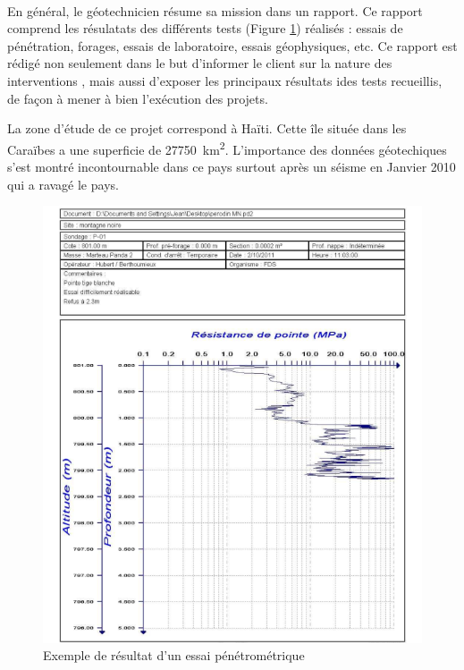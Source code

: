 \paragraph{}
En général, le géotechnicien résume sa mission dans un rapport.
Ce rapport comprend les résulatats des différents tests (Figure \ref{fig:test_penetrometrique}) réalisés : essais de pénétration, forages, essais de laboratoire,
essais géophysiques, etc.
Ce rapport est rédigé non seulement dans le but d’informer le client sur la nature des interventions
, mais aussi d’exposer les principaux résultats ides tests recueillis, de façon à mener à bien
l’exécution des projets.
\par
La zone d'étude de ce projet correspond à Haïti. 
Cette île située dans les Caraïbes a une superficie de  \SI{27750}{\kilo\metre\squared}.
L'importance des données géotechiques s'est montré incontournable dans ce pays surtout 
après un séisme en Janvier 2010 qui a ravagé le pays.
\begin{figure}
    \centering
    \includegraphics[width=1\textwidth]{./images/penetrographe.png}
    \caption{Exemple de résultat d'un essai pénétrométrique}
    \label{fig:test_penetrometrique}
\end{figure}
